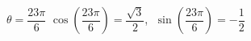 {$\theta = \dfrac{23\pi}{6}$}
{$\cos\left(\dfrac{23\pi}{6}\right) = \dfrac{\sqrt{3}}{2}$, $\; \sin\left(\dfrac{23\pi}{6}\right) = -\dfrac{1}{2}$}
